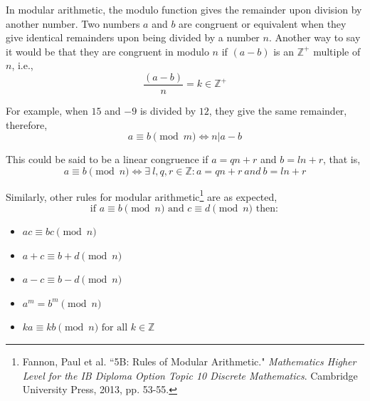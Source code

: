 \documentclass[a4paper,12pt]{article}
\theoremstyle{definition}
\begin{document}
In modular arithmetic, the modulo function gives the remainder upon division by another number. Two numbers $a$ and $b$ are congruent or equivalent when they give identical remainders upon being divided by a number $n$. Another way to say it would be that they are congruent in modulo $n$ if $(a-b)$ is an $\mathbb{Z^+}$ multiple of $n$, i.e.,
\begin{equation*}
    \frac{(a-b)}{n} = k \in \mathbb{Z^+}
\end{equation*}

For example, when $15$ and $-9$ is divided by $12$, they give the same remainder, therefore,
\begin{equation}
	a \equiv b \pmod{m} \iff n|a-b
\end{equation} 

This could be said to be a linear congruence if $a=qn+r$ and $b=ln+r$, that is,
\begin{equation}
	a \equiv b \pmod{n} \iff \exists\ l,q,r \in \mathbb{Z}: a = qn + r\ and\ b = ln + r
\end{equation}

Similarly, other rules for modular arithmetic\footnote{Fannon, Paul et al. ``5B: Rules of Modular Arithmetic." \textit{Mathematics Higher Level for the IB Diploma Option Topic 10 Discrete Mathematics}. Cambridge University Press, 2013, pp. 53-55.} are as expected,
\begin{equation*}
    \text{if } a \equiv b \pmod n \text{ and } c \equiv d \pmod n \text{ then}:
\end{equation*}

\begin{itemize}
	\item $ac \equiv bc \pmod n$
	\item $a+c \equiv b+d \pmod n$
	\item $a-c \equiv b-d \pmod n$
	\item $a^m = b^m \pmod n$
	\item $ka \equiv kb \pmod n \mbox{ for all } k\in \mathbb{Z}$
\end{itemize}
\end{document}
